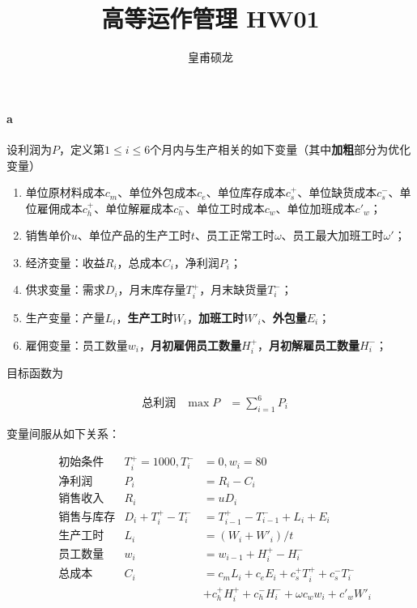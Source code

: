 \documentclass{article}
\title{高等运作管理 HW01}
\author{皇甫硕龙}
\begin{document}
    \maketitle

    \paragraph*{a} 设利润为$P$，定义第$1\leq i\leq 6$个月内与生产相关的如下变量（其中\textbf{加粗}部分为优化变量）

    \begin{enumerate}
        \item 单位原材料成本$c_m$、单位外包成本$c_e$、单位库存成本$c^+_s$、单位缺货成本$c^-_s$、单位雇佣成本$c^+_h$、单位解雇成本$c^-_h$、单位工时成本$c_w$、单位加班成本$c'_w$；
        \item 销售单价$u$、单位产品的生产工时$t$、员工正常工时$\omega$、员工最大加班工时$\omega'$；
        \item 经济变量：收益$R_i$，总成本$C_i$，净利润$P_i$；
        \item 供求变量：需求$D_i$，月末库存量$T^+_i$，月末缺货量$T^-_i$；
        \item 生产变量：产量$L_i$，\textbf{生产工时}$W_i$，\textbf{加班工时}$W'_i$、\textbf{外包量}$E_i$；
        \item 雇佣变量：员工数量$w_i$，\textbf{月初雇佣员工数量}$H^+_i$，\textbf{月初解雇员工数量}$H^-_i$；
    \end{enumerate}

    目标函数为
    
    \begin{align}
        & \text{总利润} & \max P &= \sum_{i=1}^6 P_i
    \end{align}
    
    变量间服从如下关系：

    \begin{align}
        & \text{初始条件} & T^+_i = 1000, T^-_i &= 0, w_i = 80 \\
        & \text{净利润} & P_i &= R_i - C_i \\
        & \text{销售收入} & R_i &= uD_i \\
        & \text{销售与库存} & D_i + T^+_i - T^-_i &= T^+_{i-1} - T^-_{i-1} + L_i + E_i \\
        & \text{生产工时} & L_i &= (W_i + W'_i)/t \\
        & \text{员工数量} & w_i &= w_{i-1} + H^+_i - H^-_i \\
        & \text{总成本} & C_i &= c_mL_i + c_eE_i + c^+_sT^+_i + c^-_sT^-_i \\
        & & & + c^+_hH^+_i + c^-_hH^-_i + \omega c_ww_i + c'_wW'_i
    \end{align}
\end{document}
